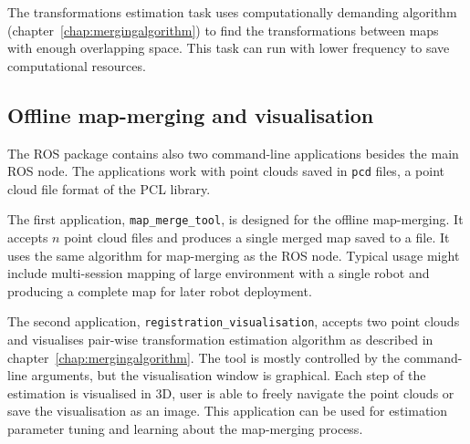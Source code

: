 The transformations estimation task uses computationally demanding algorithm (chapter~\ref{chap:mergingalgorithm}) to find the transformations between maps with enough overlapping space. This task can run with lower frequency to save computational resources.

\subsection{Offline map-merging and visualisation}
\label{sec:commandline-tools}

The \gls{ROS} package contains also two command-line applications besides the main \gls{ROS} node. The applications work with point clouds saved in \texttt{pcd} files, a point cloud file format of the \gls{PCL} library.

The first application, \texttt{map\_merge\_tool}, is designed for the offline map-merging. It accepts $n$ point cloud files and produces a single merged map saved to a file. It uses the same algorithm for map-merging as the \gls{ROS} node. Typical usage might include multi-session mapping of large environment with a single robot and producing a complete map for later robot deployment.

The second application, \texttt{registration\_visualisation}, accepts two point clouds and visualises pair-wise transformation estimation algorithm as described in chapter~\ref{chap:mergingalgorithm}. The tool is mostly controlled by the command-line arguments, but the visualisation window is graphical. Each step of the estimation is visualised in \gls{3D}, user is able to freely navigate the point clouds or save the visualisation as an image. This application can be used for estimation parameter tuning and learning about the map-merging process.

